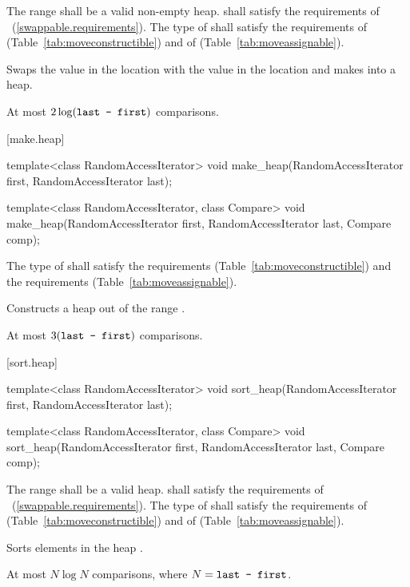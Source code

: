 \begin{itemdescr}
\pnum
\requires
The range
shall be a valid non-empty heap.
 shall satisfy the requirements of
~(\ref{swappable.requirements}). The type
of  shall satisfy the requirements of
 (Table~\ref{tab:moveconstructible}) and of
 (Table~\ref{tab:moveassignable}).


\pnum
\effects
Swaps the value in the location 
with the value in the location
and makes
into a heap.

\pnum
\complexity
At most
$2 \log(\texttt{last - first})$
comparisons.
\end{itemdescr}

[make.heap]{}

%
\begin{itemdecl}
template<class RandomAccessIterator>
  void make_heap(RandomAccessIterator first, RandomAccessIterator last);

template<class RandomAccessIterator, class Compare>
  void make_heap(RandomAccessIterator first, RandomAccessIterator last,
                 Compare comp);
\end{itemdecl}

\begin{itemdescr}
\pnum
\requires The type of  shall satisfy
the  requirements
(Table~\ref{tab:moveconstructible}) and the
 requirements
(Table~\ref{tab:moveassignable}).

\pnum
\effects
Constructs a heap out of the range
.

\pnum
\complexity
At most
$3(\texttt{last - first})$
comparisons.
\end{itemdescr}

[sort.heap]{}

%
\begin{itemdecl}
template<class RandomAccessIterator>
  void sort_heap(RandomAccessIterator first, RandomAccessIterator last);

template<class RandomAccessIterator, class Compare>
  void sort_heap(RandomAccessIterator first, RandomAccessIterator last,
                 Compare comp);
\end{itemdecl}

\begin{itemdescr}
\pnum
\requires The range  shall be a valid heap.
 shall satisfy the requirements of
~(\ref{swappable.requirements}). The type
of  shall satisfy the requirements of
 (Table~\ref{tab:moveconstructible}) and of
 (Table~\ref{tab:moveassignable}).

\pnum
\effects
Sorts elements in the heap
.

\pnum
\complexity
At most $N \log N$
comparisons, where
$N = \texttt{last - first}$.
\end{itemdescr}

